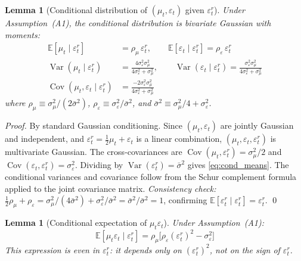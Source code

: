 \documentclass[12pt,a4paper]{article}
\newtheorem{lemma}[theorem]{Lemma}
\theoremstyle{definition}
\begin{document}
\begin{lemma}[Conditional distribution of $(\mu_t, \varepsilon_t)$
  given $\varepsilon^r_t$]
\label{lem:cond_dist}
Under Assumption~(A1), the conditional distribution is bivariate
Gaussian with moments:
\begin{align}
  \mathbb{E}[\mu_t \mid \varepsilon^r_t]
    &= \rho_\mu\,\varepsilon^r_t, \qquad
  \mathbb{E}[\varepsilon_t \mid \varepsilon^r_t]
    = \rho_\varepsilon\,\varepsilon^r_t
    \label{eq:cond_means} \\
  \operatorname{Var}(\mu_t \mid \varepsilon^r_t)
    &= \frac{4\sigma^2_\varepsilon\sigma^2_\mu}
       {4\sigma^2_\varepsilon + \sigma^2_\mu}, \qquad
  \operatorname{Var}(\varepsilon_t \mid \varepsilon^r_t)
    = \frac{\sigma^2_\varepsilon\sigma^2_\mu}
       {4\sigma^2_\varepsilon + \sigma^2_\mu}
    \label{eq:cond_vars} \\
  \operatorname{Cov}(\mu_t, \varepsilon_t \mid \varepsilon^r_t)
    &= \frac{-2\sigma^2_\varepsilon\sigma^2_\mu}
       {4\sigma^2_\varepsilon + \sigma^2_\mu}
    \label{eq:cond_cov}
\end{align}
where $\rho_\mu \equiv \sigma^2_\mu/(2\bar\sigma^2)$,
$\rho_\varepsilon \equiv \sigma^2_\varepsilon/\bar\sigma^2$, and
$\bar\sigma^2 \equiv \sigma^2_\mu/4 + \sigma^2_\varepsilon$.
\end{lemma}

\begin{proof}
By standard Gaussian conditioning. Since $(\mu_t, \varepsilon_t)$
are jointly Gaussian and independent, and $\varepsilon^r_t =
\frac{1}{2}\mu_t + \varepsilon_t$ is a linear combination,
$(\mu_t, \varepsilon_t, \varepsilon^r_t)$ is multivariate Gaussian.
The cross-covariances are $\operatorname{Cov}(\mu_t, \varepsilon^r_t)
= \sigma^2_\mu/2$ and $\operatorname{Cov}(\varepsilon_t,
\varepsilon^r_t) = \sigma^2_\varepsilon$. Dividing by
$\operatorname{Var}(\varepsilon^r_t) = \bar\sigma^2$ gives
\eqref{eq:cond_means}. The conditional variances and covariance
follow from the Schur complement formula applied to the joint
covariance matrix. \textit{Consistency check:}
$\frac{1}{2}\rho_\mu + \rho_\varepsilon =
\sigma^2_\mu/(4\bar\sigma^2) + \sigma^2_\varepsilon/\bar\sigma^2
= \bar\sigma^2/\bar\sigma^2 = 1$, confirming
$\mathbb{E}[\varepsilon^r_t \mid \varepsilon^r_t] = \varepsilon^r_t$.
\qed
\end{proof}

\begin{lemma}[Conditional expectation of $\mu_t\varepsilon_t$]
\label{lem:cond_mueps}
Under Assumption~(A1):
\begin{equation}
  \mathbb{E}[\mu_t\varepsilon_t \mid \varepsilon^r_t]
  = \rho_\mu\bigl[\rho_\varepsilon(\varepsilon^r_t)^2
    - \sigma^2_\varepsilon\bigr]
  \label{eq:cond_mueps}
\end{equation}
This expression is \emph{even} in $\varepsilon^r_t$: it depends only
on $(\varepsilon^r_t)^2$, not on the sign of $\varepsilon^r_t$.
\end{lemma}
\end{document}
